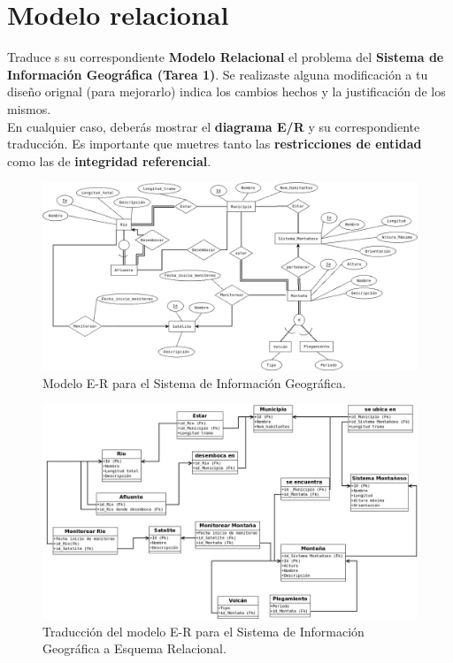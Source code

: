\documentclass{article}
\begin{document}
    \section{Modelo relacional}
    Traduce s su correspondiente \textbf{Modelo Relacional} el problema del 
    \textbf{Sistema de Información Geográfica (Tarea 1)}. Se realizaste alguna
    modificación a tu diseño orignal (para mejorarlo) indica los cambios hechos 
    y la justificación de los mismos.\\
    En cualquier caso, deberás mostrar el \textbf{diagrama E/R} y su
    correspondiente traducción. Es importante que muetres tanto las 
    \textbf{restricciones de entidad} como las de \textbf{integridad referencial}.
    
    \begin{figure}[H]
    	\begin{center}
    		\includegraphics[width=1\textwidth]{2b.png}
    	\end{center}
    	\caption{Modelo E-R para el Sistema de Información Geográfica.}
    \end{figure}
    
    \begin{figure}[H]
      \begin{center}
      	\includegraphics[width=1\textwidth]{esquemaRelacionalGeo.jpeg}
      \end{center}
      \caption{Traducción del modelo E-R para el Sistema de Información Geográfica a  Esquema Relacional.}
   \end{figure}
\end{document}
